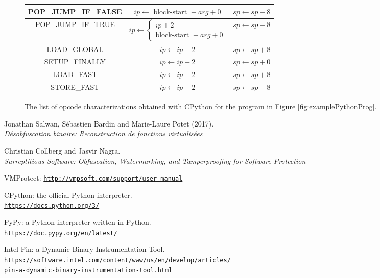 \documentclass[english]{article}
\begin{document}
\begin{figure}[htp]
\begin{tabular}{|c|c|c|}
		\hline
		POP\_JUMP\_IF\_FALSE & $ip \leftarrow \textrm{ block-start } + arg + 0$ & $sp \leftarrow sp - 8$\\
		\hline
		POP\_JUMP\_IF\_TRUE & 
		$ip \leftarrow 
		\left\{ 
		\begin{array}{ll}
		ip + 2 \\ 
		\textrm{block-start } + arg + 0
		\end{array}
		\right.$ & $sp \leftarrow sp - 8$\\
		\hline
		LOAD\_GLOBAL & $ip \leftarrow ip + 2$ & $sp \leftarrow sp + 8$\\
		\hline
		SETUP\_FINALLY & $ip \leftarrow ip + 2$ & $sp \leftarrow sp + 0$\\
		\hline
		LOAD\_FAST & $ip \leftarrow ip + 2$ & $sp \leftarrow sp + 8$\\
		\hline
		STORE\_FAST & $ip \leftarrow ip + 2$ & $sp \leftarrow sp - 8$\\
		\hline
	\end{tabular}
	\caption{The list of opcode characterizations obtained with CPython for the program in Figure \ref{fig:examplePythonProg}.}
	\label{fig:semanticsTable}
\end{figure}


\begin{thebibliography}{9}
	Jonathan Salwan, Sébastien Bardin and Marie-Laure Potet (2017).
	\\\textit{Désobfuscation binaire: Reconstruction de fonctions virtualisées}
	
	Christian Collberg and Jasvir Nagra.
	\\\textit{Surreptitious Software: Obfuscation, Watermarking, and Tamperproofing for Software Protection}
	
	VMProtect:
	\href{http://vmpsoft.com/support/user-manual}{\texttt{http://vmpsoft.com/support/user-manual}}
	
	CPython: the official Python interpreter.
	\href{https://docs.python.org/3/}{\\\texttt{https://docs.python.org/3/}}
	
	PyPy: a Python interpreter written in Python.
	\href{https://doc.pypy.org/en/latest/}{\\\texttt{https://doc.pypy.org/en/latest/}}
	
	Intel Pin: a Dynamic Binary Instrumentation Tool.
	\href{https://software.intel.com/content/www/us/en/develop/articles/pin-a-dynamic-binary-instrumentation-tool.html}{\\\texttt{https://software.intel.com/content/www/us/en/develop/articles/\\pin-a-dynamic-binary-instrumentation-tool.html}}
\end{thebibliography}
\end{document}
